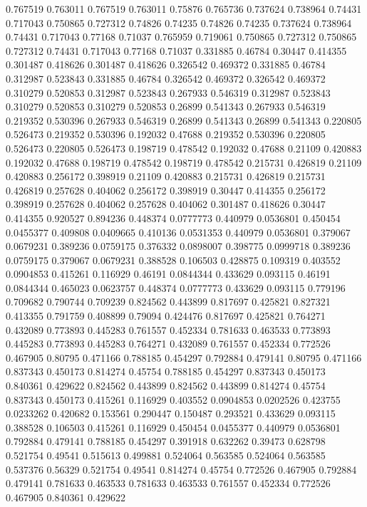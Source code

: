 0.767519 0.763011
0.767519 0.763011
0.75876 0.765736
0.737624 0.738964
0.74431 0.717043
0.750865 0.727312
0.74826 0.74235
0.74826 0.74235
0.737624 0.738964
0.74431 0.717043
0.77168 0.71037
0.765959 0.719061
0.750865 0.727312
0.750865 0.727312
0.74431 0.717043
0.77168 0.71037
0.331885 0.46784
0.30447 0.414355
0.301487 0.418626
0.301487 0.418626
0.326542 0.469372
0.331885 0.46784
0.312987 0.523843
0.331885 0.46784
0.326542 0.469372
0.326542 0.469372
0.310279 0.520853
0.312987 0.523843
0.267933 0.546319
0.312987 0.523843
0.310279 0.520853
0.310279 0.520853
0.26899 0.541343
0.267933 0.546319
0.219352 0.530396
0.267933 0.546319
0.26899 0.541343
0.26899 0.541343
0.220805 0.526473
0.219352 0.530396
0.192032 0.47688
0.219352 0.530396
0.220805 0.526473
0.220805 0.526473
0.198719 0.478542
0.192032 0.47688
0.21109 0.420883
0.192032 0.47688
0.198719 0.478542
0.198719 0.478542
0.215731 0.426819
0.21109 0.420883
0.256172 0.398919
0.21109 0.420883
0.215731 0.426819
0.215731 0.426819
0.257628 0.404062
0.256172 0.398919
0.30447 0.414355
0.256172 0.398919
0.257628 0.404062
0.257628 0.404062
0.301487 0.418626
0.30447 0.414355
0.920527 0.894236
0.448374 0.0777773
0.440979 0.0536801
0.450454 0.0455377
0.409808 0.0409665
0.410136 0.0531353
0.440979 0.0536801
0.379067 0.0679231
0.389236 0.0759175
0.376332 0.0898007
0.398775 0.0999718
0.389236 0.0759175
0.379067 0.0679231
0.388528 0.106503
0.428875 0.109319
0.403552 0.0904853
0.415261 0.116929
0.46191 0.0844344
0.433629 0.093115
0.46191 0.0844344
0.465023 0.0623757
0.448374 0.0777773
0.433629 0.093115
0.779196 0.709682
0.790744 0.709239
0.824562 0.443899
0.817697 0.425821
0.827321 0.413355
0.791759 0.408899
0.79094 0.424476
0.817697 0.425821
0.764271 0.432089
0.773893 0.445283
0.761557 0.452334
0.781633 0.463533
0.773893 0.445283
0.773893 0.445283
0.764271 0.432089
0.761557 0.452334
0.772526 0.467905
0.80795 0.471166
0.788185 0.454297
0.792884 0.479141
0.80795 0.471166
0.837343 0.450173
0.814274 0.45754
0.788185 0.454297
0.837343 0.450173
0.840361 0.429622
0.824562 0.443899
0.824562 0.443899
0.814274 0.45754
0.837343 0.450173
0.415261 0.116929
0.403552 0.0904853
0.0202526 0.423755
0.0233262 0.420682
0.153561 0.290447
0.150487 0.293521
0.433629 0.093115
0.388528 0.106503
0.415261 0.116929
0.450454 0.0455377
0.440979 0.0536801
0.792884 0.479141
0.788185 0.454297
0.391918 0.632262
0.39473 0.628798
0.521754 0.49541
0.515613 0.499881
0.524064 0.563585
0.524064 0.563585
0.537376 0.56329
0.521754 0.49541
0.814274 0.45754
0.772526 0.467905
0.792884 0.479141
0.781633 0.463533
0.781633 0.463533
0.761557 0.452334
0.772526 0.467905
0.840361 0.429622
